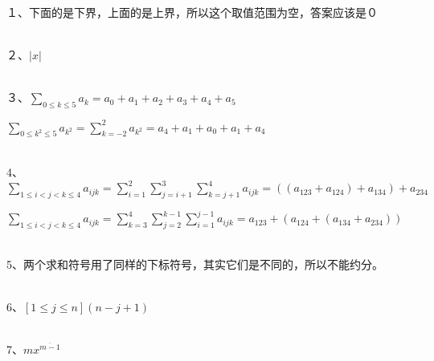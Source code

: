 \documentclass[onecolumn]{article}
\begin{document}
１、下面的是下界，上面的是上界，所以这个取值范围为空，答案应该是０ \par
~\\
２、$|x|$ \par
~\\
３、$\sum_{0\leq k\leq 5}a_{k}=a_{0}+a_{1}+a_{2}+a_{3}+a_{4}+a_{5}$ \par
$\sum_{0\leq k^{2}\leq 5}a_{k^{2}}=\sum_{k=-2}^{2}a_{k^{2}}=a_{4}+a_{1}+a_{0}+a_{1}+a_{4}$ \par
~\\
4、$\sum_{1\leq i<j<k\leq 4}a_{ijk}=\sum_{i=1}^{2}\sum_{j=i+1}^{3}\sum_{k=j+1}^{4}a_{ijk}=((a_{123}+a_{124})+a_{134})+a_{234}$\par

$\sum_{1\leq i<j<k\leq 4}a_{ijk}=\sum_{k=3}^{4}\sum_{j=2}^{k-1}\sum_{i=1}^{j-1}a_{ijk}=a_{123}+(a_{124}+(a_{134}+a_{234}))$\par
~\\
5、两个求和符号用了同样的下标符号，其实它们是不同的，所以不能约分。\par
~\\
6、$[1\leq j\leq n](n-j+1)$\par
~\\
7、$mx^{\overline{m-1}}$\par
~\\
\end{document}
